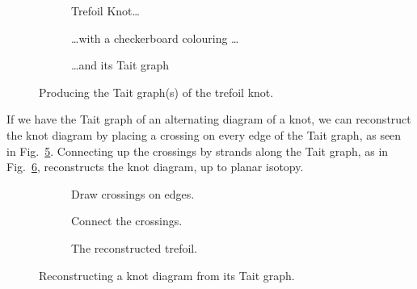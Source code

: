 \documentclass[12pt]{report}
\begin{document}
\begin{figure}[h]
	\centering
	\hspace*{\fill}
	\begin{subfigure}[b]{0.3 \textwidth}
		\centering
		\def\svgscale{0.2}
		
		\caption{Trefoil Knot\dots}
		\label{fig:trefoil-blank}
	\end{subfigure}
	\hspace*{\fill}
	\begin{subfigure}[b]{0.3 \textwidth}
		\centering
		\def\svgscale{0.2}
		
		\caption{\dots with a checkerboard colouring \dots}
		\label{fig:trefoil-checker}
	\end{subfigure}
	\hspace*{\fill}
	\begin{subfigure}[b]{0.3 \textwidth}
		\centering
		\def\svgscale{0.2}
		
		\caption{\dots and its Tait graph}
		\label{fig:trefoil-checker-tait}
	\end{subfigure}
	\hspace*{\fill}
	\caption{Producing the Tait graph(s) of the trefoil knot.}
	\label{fig:tait-example}
\end{figure}

If we have the Tait graph of an alternating diagram of a knot, we can reconstruct the knot diagram by placing a crossing on every edge of the Tait graph, as seen in Fig.~\ref{fig:trefoil-tait-with-crossings}. Connecting up the crossings by strands along the Tait graph, as in Fig.~\ref{fig:trefoil-resconstructed},	 reconstructs the knot diagram, up to planar isotopy.

\begin{figure}[h]
	\centering
	\hspace*{\fill}
	\begin{subfigure}[b]{0.3 \textwidth}
		\centering
		\def\svgscale{0.22}
		
		\caption{Draw crossings on edges.}
		\label{fig:trefoil-tait-with-crossings}
	\end{subfigure}
	\hspace*{\fill}
	\begin{subfigure}[b]{0.3 \textwidth}
		\centering
		\def\svgscale{0.22}
		
		\caption{Connect the crossings.}
		\label{fig:trefoil-resconstructed}
	\end{subfigure}
	\hspace*{\fill}
	\begin{subfigure}[b]{0.3 \textwidth}
		\centering
		\def\svgscale{0.2}
		
		\caption{The reconstructed trefoil.}
		\label{fig:trefoil-resconstructed-isotopy}
	\end{subfigure}
	\hspace*{\fill}
	\caption{Reconstructing a knot diagram from its Tait graph.}
	\label{fig:tait-reconstruction-example}
\end{figure}
\end{document}

